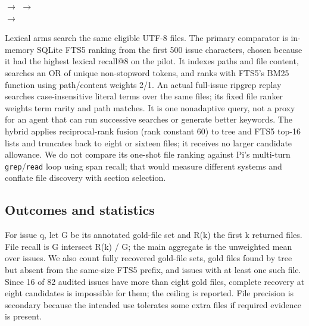 \documentclass[
]{article}
\begin{document}
\begin{center}\small
{}\; $\longrightarrow$\;
\; $\longrightarrow$\; \\[5pt]
\; $\longrightarrow$\;
\label{fig:pipeline}
\end{center}

Lexical arms search the same eligible UTF-8 files. The primary comparator
is in-memory SQLite FTS5 ranking from the first 500 issue characters,
chosen because it had the highest lexical recall@8 on the pilot. It
indexes paths and file content, searches an OR of unique non-stopword
tokens, and ranks with FTS5's BM25 function using path/content weights
2/1. An actual full-issue ripgrep replay searches case-insensitive
literal terms over the same files; its fixed file ranker weights term
rarity and path matches. It is one nonadaptive query, not a proxy for an
agent that can run successive searches or generate better keywords. The
hybrid applies reciprocal-rank fusion (rank constant 60) to tree and
FTS5 top-16 lists and truncates back to eight or sixteen files; it
receives no larger candidate allowance. We do not compare its one-shot
file ranking against Pi's multi-turn \texttt{grep}/\texttt{read} loop
using span recall; that would measure different systems and conflate
file discovery with section selection.

\subsection{Outcomes and statistics}\label{outcomes-and-statistics}

For issue q, let G be its annotated gold-file set and R(k) the first k
returned files. File recall is \textbar G intersect R(k)\textbar{} /
\textbar G\textbar; the main aggregate is the unweighted mean over
issues. We also count fully recovered gold-file sets, gold files found
by tree but absent from the same-size FTS5 prefix, and issues with at
least one such file. Since 16 of 82 audited issues have more than eight
gold files, complete recovery at eight candidates is impossible for
them; the ceiling is reported. File precision is secondary because the
intended use tolerates some extra files if required evidence is present.
\end{document}
